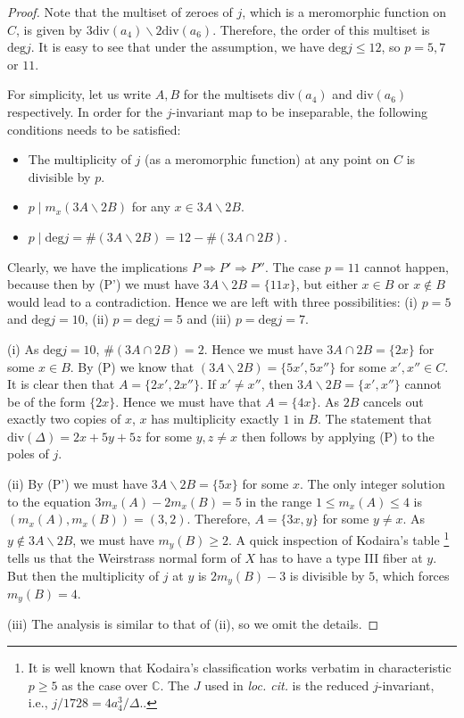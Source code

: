 \documentclass[11pt, letterpaper]{amsart}
\theoremstyle{plain}
\theoremstyle{definition}
\newcommand{\IC}{\mathbb{C}}
\renewcommand{\deg}{\mathrm{deg}}
\newcommand{\<}{\langle}
\renewcommand{\>}{\rangle}
\renewcommand{\div}{\mathrm{div}}
\begin{document}
\begin{proof}
    Note that the multiset of zeroes of $j$, which is a meromorphic function on $C$, is given by $3 \div(a_4) \smallsetminus 2\div(a_6)$. 
    Therefore, the order of this multiset is $\deg j$. 
    It is easy to see that under the assumption, we have $\deg j \le 12$, so $p = 5, 7$ or $11$. 

    For simplicity, let us write $A, B$ for the multisets $\div(a_4)$ and $\div(a_6)$ respectively. 
    In order for the $j$-invariant map to be inseparable, the following conditions needs to be satisfied:
    \begin{itemize}
        \item[(P)] The multiplicity of $j$ (as a meromorphic function) at any point on $C$ is divisible by $p$.
        \item[(P')] $p \mid m_x(3A \smallsetminus 2B)$ for any $x \in 3A \smallsetminus 2B$.
        \item[(P'')] $p \mid \deg j = \#(3A \smallsetminus 2 B) = 12 - \#(3A \cap 2B)$.  
    \end{itemize}
    Clearly, we have the implications $P \Rightarrow P' \Rightarrow P''$. 
    The case $p = 11$ cannot happen, because then by (P') we must have $3 A \smallsetminus 2 B = \{ 11 x \}$, but either $x \in B$ or $x \not\in B$ would lead to a contradiction. 
    Hence we are left with three possibilities: (i) $p = 5$ and $\deg j = 10$, (ii) $p = \deg j = 5$ and (iii) $ p = \deg j = 7$. 
    
    (i) As $\deg j = 10$, $\#(3A \cap 2B) = 2$. 
    Hence we must have $3A \cap 2B = \{ 2 x \}$ for some $x \in B$. 
    By (P) we know that $(3A \smallsetminus 2B) = \{ 5x', 5x''\}$ for some $x', x'' \in C$. It is clear then that $A = \{ 2x', 2x'' \}$. If $x' \neq x''$, then $3A \smallsetminus 2B = \{ x', x'' \}$ cannot be of the form $\{ 2 x \}$. Hence we must have that $A = \{ 4x \}$. As $2B$ cancels out exactly two copies of $x$, $x$ has multiplicity exactly $1$ in $B$. The statement that $\div(\Delta)= 2x + 5y + 5z$ for some $y, z \neq x$ then follows by applying (P) to the poles of $j$. 
    
    (ii) By (P') we must have $3A \smallsetminus 2B = \{ 5x \}$ for some $x$.  The only integer solution to the equation $3 m_x(A) - 2 m_x(B) = 5$ in the range $1 \le m_x(A) \le 4$ is $(m_x(A), m_x(B)) = (3, 2)$. 
        Therefore, $ A= \{ 3x , y \}$ for some $y \neq x$. As $y \not\in 3A \smallsetminus 2B$, we must have $m_y(B) \ge 2$.
        A quick inspection of Kodaira's table \cite[p.41, IV.3.1]{Miranda}\footnote{It is well known that Kodaira's classification works verbatim in characteristic $p \ge 5$ as the case over $\IC$. 
        The $J$ used in \textit{loc. cit.} is the reduced $j$-invariant, i.e., $j / 1728 = 4a_4^3/ \Delta.$.  } tells us that the Weirstrass normal form of $X$ has to have a type III fiber at $y$.
        But then the multiplicity of $j$ at $y$ is $2 m_y(B) - 3$ is divisible by $5$, which forces $m_y(B) = 4$. 
        
        (iii) The analysis is similar to that of (ii), so we omit the details. 
\end{proof}
\end{document}
